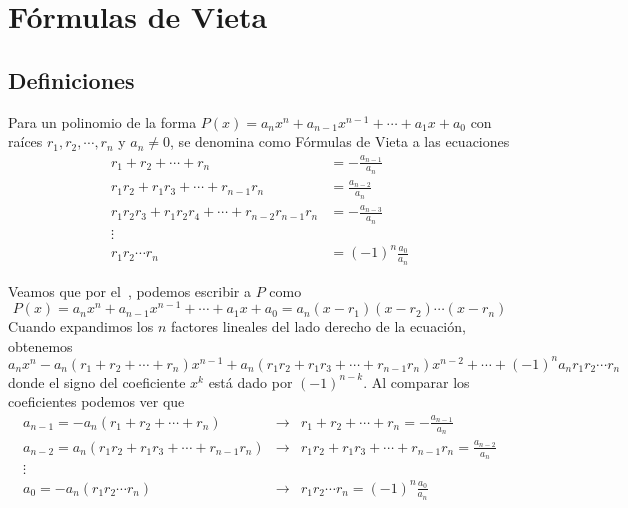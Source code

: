 \newpage
\section{Fórmulas de Vieta}

\subsection{Definiciones}

\begin{section-definition.tcb}\label{vietas-formula}
    Para un polinomio de la forma $P(x) = a_n x^n + a_{n - 1} x^{n - 1} + \cdots  + a_1 x + a_0$ con raíces $r_1, r_2, \cdots, r_n$ y $a_n \neq 0$, se denomina como Fórmulas de Vieta a las ecuaciones
    \begin{align*}
        r_1 + r_2 + \cdots + r_n &= - \frac{a_{n - 1}}{a_n}\\
        r_1 r_2 + r_1 r_3 + \cdots + r_{n - 1} r_n &= \frac{a_{n - 2}}{a_n}\\
        r_1 r_2 r_3 + r_1 r_2 r_4 + \cdots + r_{n - 2} r_{n - 1} r_n &= -\frac{a_{n - 3}}{a_n}\\
        \vdots\\
        r_1 r_2 \cdots r_n &= (-1)^n \frac{a_0}{a_n}
    \end{align*}
\end{section-definition.tcb}

Veamos que por el~, podemos escribir a $P$ como
\[
    P(x) = a_n x^n + a_{n - 1} x^{n - 1} + \cdots  + a_1 x + a_0 = a_n (x - r_1)(x - r_2) \cdots (x - r_n)
\]
Cuando expandimos los $n$ factores lineales del lado derecho de la ecuación, obtenemos
\[
    a_n x^n - a_n(r_1 + r_2 + \cdots + r_n)x^{n - 1} + a_n(r_1 r_2 + r_1 r_3 + \cdots + r_{n - 1} r_n)x^{n - 2} + \cdots + (-1)^n a_n r_1 r_2 \cdots r_n
\]
donde el signo del coeficiente $x^k$ está dado por $(-1)^{n - k}$.
Al comparar los coeficientes podemos ver que
\begin{align*}
    a_{n - 1} = - a_n(r_1 + r_2 + \cdots + r_n) &\to& r_1 + r_2 + \cdots + r_n = - \frac{a_{n - 1}}{a_n}\\
    a_{n - 2} =   a_n (r_1 r_2 + r_1 r_3 + \cdots + r_{n - 1} r_n) &\to& r_1 r_2 + r_1 r_3 + \cdots + r_{n - 1} r_n = \frac{a_{n - 2}}{a_n}\\
    \vdots\\
    a_{0} = - a_n (r_1 r_2 \cdots r_n)&\to& r_1 r_2 \cdots r_n = (-1)^n \frac{a_0}{a_n}
\end{align*}

